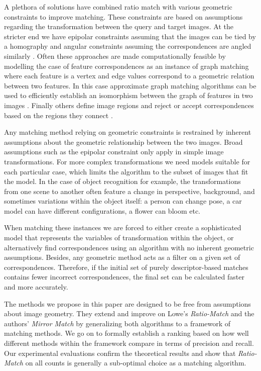 \documentclass[10pt,journal,cspaper,compsoc]{IEEEtran}
\begin{document}
A plethora of solutions have combined ratio match with various geometric 
constraints to improve matching. These constraints are based on 
assumptions regarding the transformation between the query and target 
images. At the stricter end we have epipolar constraints assuming
that the images can be tied by a homography \cite{torr2000mlesac, chum2005matching} and angular constraints assuming the 
correspondences are angled similarly \cite{kim2008efficient, schmid1997local}. Often these approaches are made computationally 
feasible by modelling the case of feature correspondences as an instance 
of graph matching where each feature is a vertex and edge values 
correspond to a geometric relation between two features. In this case 
approximate graph matching algorithms can be used to efficiently 
establish an isomorphism between the graph of features in two images 
\cite{leordeanu2005spectral, torresani2008feature, yarkony2010covering}. Finally others define image regions and 
reject or accept correspondences based on the regions they connect 
\cite{cho2009feature, wu2011robust}.

Any matching method relying on geometric constraints is restrained by 
inherent assumptions about the geometric relationship between the two 
images. Broad assumptions such as the epipolar constraint only apply in 
simple image transformations. For more complex transformations we need 
models suitable for each particular case, which limits the algorithm 
to the subset of images that fit the model.  In the case of object 
recognition for example, the transformations from one scene to another 
often feature a change in perspective, background, and sometimes variations within the object 
itself: a person can change pose, a car model can have different 
configurations, a flower can bloom etc.

When matching these instances we are forced to either create a 
sophisticated model that represents the variables of transformation 
within the object, or alternatively find correspondences using an 
algorithm with no inherent geometric assumptions. Besides, 
any geometric method acts as a filter on a given set of 
correspondences.  Therefore, if the initial set of purely descriptor-based matches contains fewer incorrect correspondences, 
the final set can be calculated faster and more accurately.

The methods we propose in this paper are designed to be free from 
assumptions about image geometry. They extend and improve on Lowe's 
\emph{Ratio-Match} \cite{lowe2004sift} and the authors' \emph{Mirror 
Match} \cite{arnfred2013mirror} by generalizing both algorithms to a 
framework of matching methods. We go on to formally establish a ranking
based on how well different methods within the framework compare in 
terms of precision and recall. Our experimental evaluations confirm the 
theoretical results and show that \emph{Ratio-Match} on all counts is generally a 
sub-optimal choice as a matching algorithm. 
\end{document}
